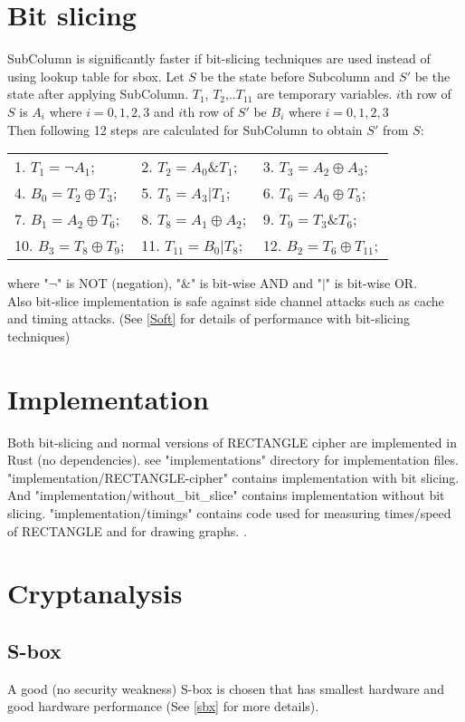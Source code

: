 \documentclass[final]{transcrypto}
\begin{document}
\section{Bit slicing}
SubColumn is significantly faster if bit-slicing techniques are used instead of using lookup table for sbox.
Let $S$ be the state before Subcolumn and $S'$ be the state after applying SubColumn. $T_{1}$, $T_{2}$,..$T_{11}$ are temporary variables. $i$th row of $S$ is 
$A_i$ where $i={0,1,2,3}$ and $i$th row of $S'$ be $B_i$ where $i={0,1,2,3}$\\
Then following 12 steps are calculated for SubColumn to obtain $S'$ from $S$:
\begin{table}[H]
	\begin{tabular}{lll}
1. $T_1=\neg A_1;$  & 2. $T_2=A_0\&T_1;$ & 3. $T_3=A_2\oplus A_3;$ \\
4. $B_0=T_2\oplus T_3;$ & 5. $T_5=A_3|T_1;$  & 6. $T_6=A_0\oplus T_5;$ \\
7. $B_1=A_2\oplus T_6;$ & 8. $T_8=A_1\oplus A_2;$ & 9. $T_9=T_3\&T_6;$ \\
10. $B_3=T_8\oplus T_9;$  & 11. $T_{11}=B_0|T_8;$ & 12. $B_2=T_6\oplus T_{11};$ \\
	\end{tabular}
\end{table}
where "$\neg$" is NOT (negation), "$\&$" is bit-wise AND and "$|$" is bit-wise OR.\\
Also bit-slice implementation is safe against side channel attacks such as cache and timing attacks.\cite{rectangle}
(See \ref{Soft} for details of performance with bit-slicing techniques)
\section{Implementation}
Both bit-slicing and normal versions of RECTANGLE cipher are implemented in Rust (no dependencies).
see "implementations" directory for implementation files. "implementation/RECTANGLE-cipher" contains implementation with bit slicing. And "implementation/without\_bit\_slice" contains implementation without bit slicing. "implementation/timings" contains code used for measuring times/speed of RECTANGLE and  for drawing graphs.
.\section{Cryptanalysis}
\subsection{S-box}
A good (no security weakness) S-box is chosen that has smallest hardware and good hardware performance (See \ref{sbx} for more details). 
\end{document}
